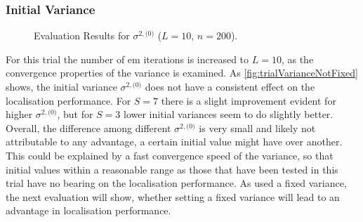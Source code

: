 \subsubsection*{Initial Variance}

\begin{figure}[H]
\iftoggle{quick}{
    \texttt{[image: plots/boxplots/boxplot-joined-var-val-est]}
}{%
    
}
	\caption[Evaluation Results for $\sigma^{2,\text{(0)}}$]{Evaluation Results for $\sigma^{2,\text{(0)}}$ ($L=10$, $n=200$).}
	\label{fig:trialVarianceNotFixed}
\end{figure}

For this trial the number of \gls{em} iterations is increased to $L=10$, as the convergence properties of the variance is examined. As \autoref{fig:trialVarianceNotFixed} shows, the initial variance $\sigma^{2, \text{(0)}}$ does not have a consistent effect on the localisation performance. For $S=7$ there is a slight improvement evident for higher $\sigma^{2, \text{(0)}}$, but for $S=3$ lower initial variances seem to do slightly better. Overall, the difference among different $\sigma^{2, \text{(0)}}$ is very small and likely not attributable to any advantage, a certain initial value might have over another. This could be explained by a fast convergence speed of the variance, so that initial values within a reasonable range as those that have been tested in this trial have no bearing on the localisation performance. As \cite{Schwartz2014} used a fixed variance, the next evaluation will show, whether setting a fixed variance will lead to an advantage in localisation performance.